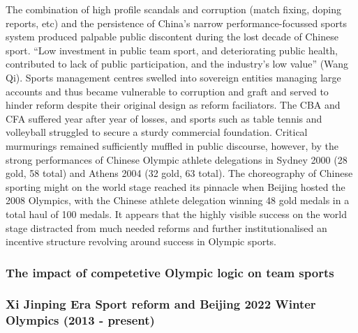 {The combination of high profile scandals and corruption (match fixing, doping reports, etc) and the persistence of China's narrow performance-focussed sports system produced palpable public discontent during the lost decade of Chinese sport. ``Low investment in public team sport, and deteriorating public health, contributed to lack of public participation, and the industry’s low value'' (Wang Qi). Sports management centres swelled into sovereign entities managing large accounts and thus became vulnerable to corruption and graft and served to hinder reform despite their original design as reform faciliators. The CBA and CFA suffered year after year of losses, and sports such as table tennis and volleyball struggled to secure a sturdy commercial foundation. Critical murmurings remained sufficiently muffled in public discourse, however, by the strong performances of Chinese Olympic athlete delegations in Sydney 2000 (28 gold, 58 total) and Athens 2004 (32 gold, 63 total). The choreography of Chinese sporting might on the world stage reached its pinnacle when Beijing hosted the 2008 Olympics, with the Chinese athlete delegation winning 48 gold medals in a total haul of 100 medals.  It appears that the highly visible success on the world stage distracted from much needed reforms and further institutionalised an incentive structure revolving around success in Olympic sports.

\subsubsection{The impact of competetive Olympic logic on team sports}







\subsubsection{Xi Jinping Era Sport reform and Beijing 2022 Winter Olympics (2013 - present)}

}
